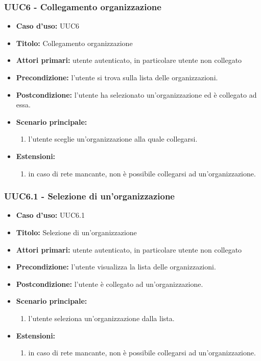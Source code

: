\documentclass[casi-duso]{subfiles}
\begin{document}
\subsubsection{UUC6 - Collegamento organizzazione}%
\label{subsub:UUC6utente}
\begin{itemize}
  \item \textbf{Caso d’uso:} UUC6
  \item \textbf{Titolo:} Collegamento organizzazione
  \item \textbf{Attori primari:} utente autenticato, in particolare utente non collegato
  \item \textbf{Precondizione:} l'utente si trova sulla lista delle organizzazioni.
  \item \textbf{Postcondizione:} l'utente ha selezionato un'organizzazione ed è collegato ad essa.
  \item \textbf{Scenario principale:}
        \begin{enumerate}
          \item l'utente sceglie un'organizzazione alla quale collegarsi.
        \end{enumerate}
  \item \textbf{Estensioni:}
        \begin{enumerate}
          \item in caso di rete mancante, non è possibile collegarsi ad un'organizzazione.
        \end{enumerate}
\end{itemize}

\subsubsection{UUC6.1 - Selezione di un'organizzazione}%
\label{subsub:UUC6utente}
\begin{itemize}
  \item \textbf{Caso d’uso:} UUC6.1
  \item \textbf{Titolo:} Selezione di un'organizzazione
  \item \textbf{Attori primari:} utente autenticato, in particolare utente non collegato
  \item \textbf{Precondizione:} l'utente visualizza la lista delle organizzazioni.
  \item \textbf{Postcondizione:} l'utente è collegato ad un'organizzazione.
  \item \textbf{Scenario principale:}
        \begin{enumerate}
          \item l'utente seleziona un'organizzazione dalla lista.
        \end{enumerate}
  \item \textbf{Estensioni:}
        \begin{enumerate}
          \item in caso di rete mancante, non è possibile collegarsi ad un'organizzazione.
        \end{enumerate}
\end{itemize}
\end{document}
